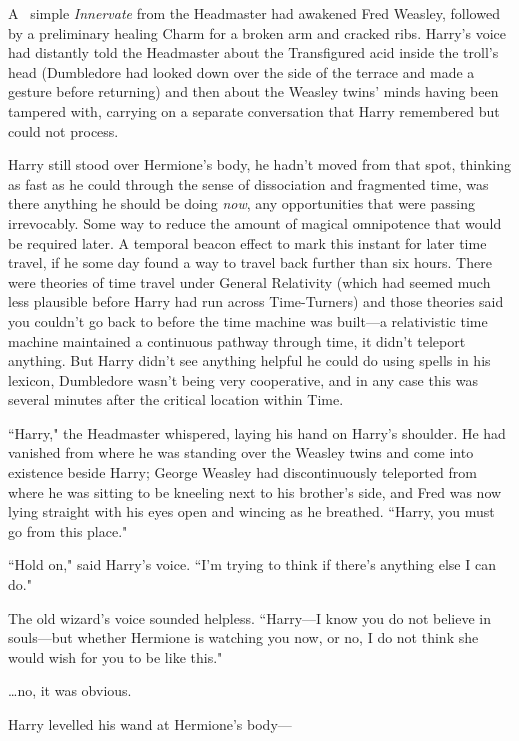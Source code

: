 
\lettrine{A}{~} simple \emph{Innervate} from the Headmaster had awakened Fred Weasley, followed by a preliminary healing Charm for a broken arm and cracked ribs. Harry's voice had distantly told the Headmaster about the Transfigured acid inside the troll's head (Dumbledore had looked down over the side of the terrace and made a gesture before returning) and then about the Weasley twins' minds having been tampered with, carrying on a separate conversation that Harry remembered but could not process.

Harry still stood over Hermione's body, he hadn't moved from that spot, thinking as fast as he could through the sense of dissociation and fragmented time, was there anything he should be doing \emph{now}, any opportunities that were passing irrevocably. Some way to reduce the amount of magical omnipotence that would be required later. A temporal beacon effect to mark this instant for later time travel, if he some day found a way to travel back further than six hours. There were theories of time travel under General Relativity (which had seemed much less plausible before Harry had run across Time-Turners) and those theories said you couldn't go back to before the time machine was built—a relativistic time machine maintained a continuous pathway through time, it didn't teleport anything. But Harry didn't see anything helpful he could do using spells in his lexicon, Dumbledore wasn't being very cooperative, and in any case this was several minutes after the critical location within Time.

``Harry," the Headmaster whispered, laying his hand on Harry's shoulder. He had vanished from where he was standing over the Weasley twins and come into existence beside Harry; George Weasley had discontinuously teleported from where he was sitting to be kneeling next to his brother's side, and Fred was now lying straight with his eyes open and wincing as he breathed. ``Harry, you must go from this place."

``Hold on," said Harry's voice. ``I'm trying to think if there's anything else I can do."

The old wizard's voice sounded helpless. ``Harry—I know you do not believe in souls—but whether Hermione is watching you now, or no, I do not think she would wish for you to be like this."

{\ldots}no, it was obvious.

Harry levelled his wand at Hermione's body—

